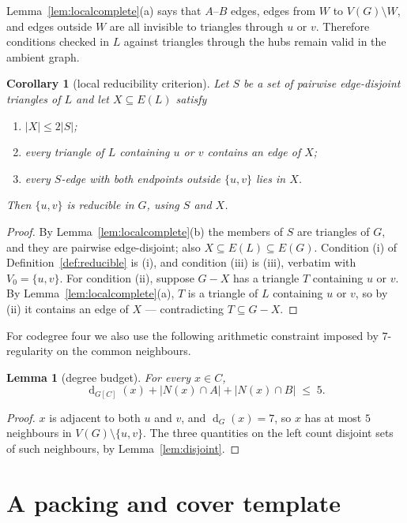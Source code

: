 \documentclass[11pt,a4paper]{amsart}
\theoremstyle{plain}
\newtheorem{lemma}[theorem]{Lemma}
\newtheorem{corollary}[theorem]{Corollary}
\theoremstyle{definition}
\newcommand{\N}{N}
\newcommand{\dg}{\operatorname{d}}
\begin{document}
Lemma~\ref{lem:localcomplete}(a) says that $A$--$B$ edges, edges from $W$ to
$V(G)\setminus W$, and edges outside $W$ are all invisible to triangles
through $u$ or $v$. Therefore conditions checked in $L$ against triangles
through the hubs remain valid in the ambient graph.

\begin{corollary}[local reducibility criterion]\label{cor:localcriterion}
Let $S$ be a set of pairwise edge-disjoint triangles of $L$ and let
$X\subseteq E(L)$ satisfy
\begin{enumerate}
  \item[(i)] $|X|\le 2|S|$;
  \item[(ii)] every triangle of $L$ containing $u$ or $v$ contains an edge of
    $X$;
  \item[(iii)] every $S$-edge with both endpoints outside $\{u,v\}$ lies in
    $X$.
\end{enumerate}
Then $\{u,v\}$ is reducible in $G$, using $S$ and $X$.
\end{corollary}

\begin{proof}
By Lemma~\ref{lem:localcomplete}(b) the members of $S$ are triangles of $G$,
and they are pairwise edge-disjoint; also $X\subseteq E(L)\subseteq E(G)$.
Condition (i) of Definition~\ref{def:reducible} is (i), and condition (iii)
is (iii), verbatim with $V_0=\{u,v\}$. For condition (ii), suppose $G-X$ has
a triangle $T$ containing $u$ or $v$. By Lemma~\ref{lem:localcomplete}(a),
$T$ is a triangle of $L$ containing $u$ or $v$, so by (ii) it contains an edge
of $X$ --- contradicting $T\subseteq G-X$.
\end{proof}

For codegree four we also use the following arithmetic constraint imposed by
$7$-regularity on the common neighbours.

\begin{lemma}[degree budget]\label{lem:budget}
For every $x\in C$,
\[
  \dg_{G[C]}(x)+|\N(x)\cap A|+|\N(x)\cap B|\;\le\;5 .
\]
\end{lemma}

\begin{proof}
$x$ is adjacent to both $u$ and $v$, and $\dg_G(x)=7$, so $x$ has at most $5$
neighbours in $V(G)\setminus\{u,v\}$. The three quantities on the left count
disjoint sets of such neighbours, by Lemma~\ref{lem:disjoint}.
\end{proof}

\section{A packing and cover template}\label{sec:template}
\end{document}
